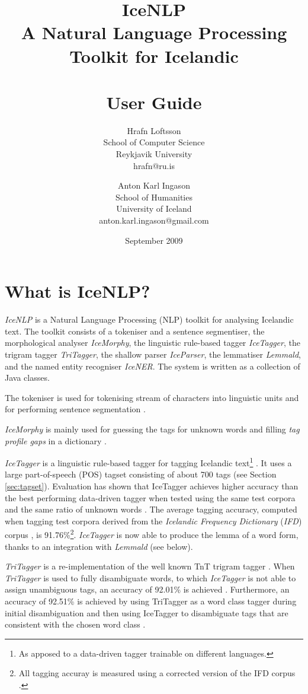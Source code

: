 \documentclass[11pt]{article}
\title{IceNLP \\
A Natural Language Processing Toolkit for Icelandic \\ \ \\
    User Guide}
\author{Hrafn Loftsson \\
        School of Computer Science \\
        Reykjavik University \\
        hrafn@ru.is 
\and
	Anton Karl Ingason \\
	School of Humanities \\
	University of Iceland \\
	anton.karl.ingason@gmail.com \\
}
\begin{document}
\label{firstpage}
\date{September 2009}
\maketitle
\tableofcontents
\newpage

\section{What is IceNLP?}
\emph{IceNLP} is a Natural Language Processing (NLP) toolkit for analysing Icelandic text.
The toolkit consists of a tokeniser and a sentence segmentiser, the morphological analyser \emph{IceMorphy}, the linguistic rule-based tagger \emph{IceTagger}, the trigram tagger \emph{TriTagger}, the shallow parser \emph{IceParser}, the lemmatiser \emph{Lemmald}, and the named entity recogniser \emph{IceNER}.
The system is written as a collection of Java classes.

The tokeniser is used for tokenising stream of characters into linguistic units and for performing sentence segmentation \citep{pal00}.

\emph{IceMorphy} is mainly used for guessing the tags for unknown words and filling \emph{tag profile gaps} in a dictionary \citep{lof08}.

\emph{IceTagger} is a linguistic rule-based tagger for tagging Icelandic text\footnote{As apposed to a data-driven tagger trainable on different languages.} \citep{lof06,lof08}.
It uses a large part-of-speech (POS) tagset consisting of about 700 tags (see Section \ref{sec:tagset}).
Evaluation has shown that IceTagger achieves higher accuracy than the best performing data-driven tagger when tested using the same test corpora and the same ratio of unknown words \citep{lof08,hel04}.
The average tagging accuracy, computed when tagging test corpora derived from the \emph{Icelandic Frequency Dictionary} (\emph{IFD}) corpus \citep{pin91}, is 91.76\%\footnote{All tagging accuray is measured using a corrected version of the IFD corpus \citep{lof09}.}.
\emph{IceTagger} is now able to produce the lemma of a word form, thanks to an integration with \emph{Lemmald} (see below).

\emph{TriTagger} is a re-implementation of the well known TnT trigram tagger \citep{bra00}.
When \emph{TriTagger} is used to fully disambiguate words, to which \emph{IceTagger} is not able to assign unambiguous tags, an accuracy of 92.01\% is achieved \citep{lof06b,lof09b}.
Furthermore, an accuracy of 92.51\% is achieved by using TriTagger as a word class tagger during initial disambiguation and then using IceTagger to disambiguate tags that are consistent with the chosen word class \citep{lof09b}.
\end{document}
